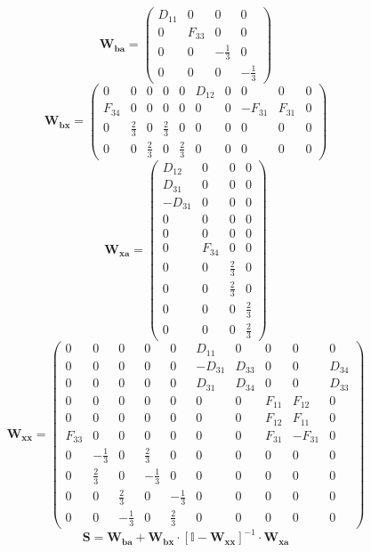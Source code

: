 \[ \mathbf{W_{ba}} = \left(\begin{smallmatrix} D_{11} & 0 & 0 & 0 \\ 0
& F_{33} & 0 & 0 \\ 0 & 0 & -\frac{1}{3} & 0 \\ 0 & 0 & 0 &
-\frac{1}{3} \end{smallmatrix}\right) \]
\[ \mathbf{W_{bx}} = \left(\begin{smallmatrix} 0 & 0 & 0 & 0 & 0 &
D_{12} & 0 & 0 & 0 & 0 \\ F_{34} & 0 & 0 & 0 & 0 & 0 & 0 & -F_{31} &
F_{31} & 0 \\ 0 & \frac{2}{3} & 0 & \frac{2}{3} & 0 & 0 & 0 & 0 & 0 &
0 \\ 0 & 0 & \frac{2}{3} & 0 & \frac{2}{3} & 0 & 0 & 0 & 0 & 0
\end{smallmatrix}\right) \]
\[ \mathbf{W_{xa}} = \left(\begin{smallmatrix} D_{12} & 0 & 0 & 0 \\
D_{31} & 0 & 0 & 0 \\ -D_{31} & 0 & 0 & 0 \\ 0 & 0 & 0 & 0 \\ 0 & 0 &
0 & 0 \\ 0 & F_{34} & 0 & 0 \\ 0 & 0 & \frac{2}{3} & 0 \\ 0 & 0 &
\frac{2}{3} & 0 \\ 0 & 0 & 0 & \frac{2}{3} \\ 0 & 0 & 0 & \frac{2}{3}
\end{smallmatrix}\right) \]
\[ \mathbf{W_{xx}} = \left(\begin{smallmatrix} 0 & 0 & 0 & 0 & 0 &
D_{11} & 0 & 0 & 0 & 0 \\ 0 & 0 & 0 & 0 & 0 & -D_{31} & D_{33} & 0 & 0
& D_{34} \\ 0 & 0 & 0 & 0 & 0 & D_{31} & D_{34} & 0 & 0 & D_{33} \\ 0
& 0 & 0 & 0 & 0 & 0 & 0 & F_{11} & F_{12} & 0 \\ 0 & 0 & 0 & 0 & 0 & 0
& 0 & F_{12} & F_{11} & 0 \\ F_{33} & 0 & 0 & 0 & 0 & 0 & 0 & F_{31} &
-F_{31} & 0 \\ 0 & -\frac{1}{3} & 0 & \frac{2}{3} & 0 & 0 & 0 & 0 & 0
& 0 \\ 0 & \frac{2}{3} & 0 & -\frac{1}{3} & 0 & 0 & 0 & 0 & 0 & 0 \\ 0
& 0 & \frac{2}{3} & 0 & -\frac{1}{3} & 0 & 0 & 0 & 0 & 0 \\ 0 & 0 &
-\frac{1}{3} & 0 & \frac{2}{3} & 0 & 0 & 0 & 0 & 0
\end{smallmatrix}\right) \]
\[ \mathbf{S}=\mathbf{W_{ba}}+\mathbf{W_{bx}}\cdot\left[ \mathbb{I}
-\mathbf{W_{xx}}\right]^{-1}\cdot\mathbf{W_{xa}} \]
